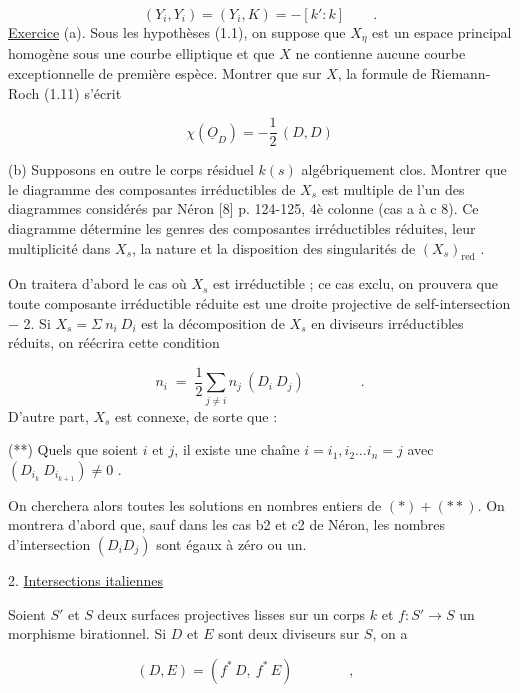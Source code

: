 \begin{equation*}
(Y_i,Y_i) = (Y_i,K) = -[k':k] \qquad .
\end{equation*}
\underline{Exercice} (a). Sous les hypothèses (1.1), on suppose que $X_\eta$ est un espace principal homogène sous une courbe elliptique et que $X$ ne contienne aucune courbe exceptionnelle de première espèce. Montrer que sur $X$, la formule de Riemann-Roch (1.11) s'écrit

\begin{equation*}
\chi(\underline{O}_D) = - \frac{1}{2} \, (D,D)
\end{equation*}


(b) Supposons en outre le corps résiduel $k(s)$ algébriquement clos. Montrer que le diagramme des composantes irréductibles de $X_s$ est multiple de l'un des diagrammes considérés par Néron [8] p. 124-125, 4è colonne (cas a à c 8). Ce diagramme détermine les genres des composantes irréductibles réduites, leur multiplicité dans $X_s$, la nature et la disposition des singularités de $(X_s)_{\mathrm{red}}$ .

On traitera d'abord le cas où $X_s$ est irréductible ; ce cas exclu, on prouvera que toute composante irréductible réduite est une droite projective de self-intersection $-$ 2. Si $X_s = \Sigma\ n_i\ D_i$ est la décomposition de $X_s$ en diviseurs irréductibles réduits, on réécrira cette condition

\begin{equation}\tag{*}
n_i \;=\; \frac{1}{2} \sum_{j \neq i} n_j \ (D_i\ D_j) \qquad\qquad .
\end{equation}
D'autre part, $X_s$ est connexe, de sorte que :

(**) Quels que soient $i$ et $j$, il existe une chaîne $i = i_1, i_2 \ldots i_n = j$ avec $(D_{i_k}\ D_{i_{k+1}}) \neq 0$ .

On cherchera alors toutes les solutions en nombres entiers de $(*) + (**)$. On montrera d'abord que, sauf dans les cas b2 et c2 de Néron, les nombres d'intersection $(D_i D_j)$ sont égaux à zéro ou un.


2. \underline{Intersections italiennes}

Soient $S'$ et $S$ deux surfaces projectives lisses sur un corps $k$ et $f : S' \longrightarrow S$ un morphisme birationnel. Si $D$ et $E$ sont deux diviseurs sur $S$, on a

\begin{equation*}
(D,E) = (f^* \, D, \ f^* \, E) \qquad\qquad , \qquad 
\end{equation*}

